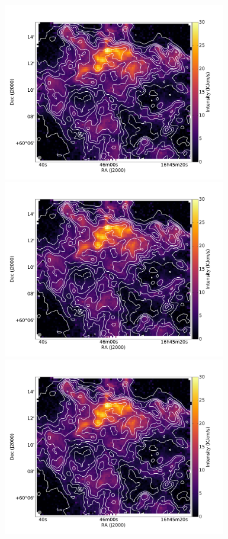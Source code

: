 \documentclass[traditabstract]{aa}
\begin{document}
\begin{figure}[h!]
  \centering
  \includegraphics[page=1,height=7.8cm,trim=25 30 90 75,clip=true]{Figures/CO10_intensity.pdf}
  \hspace{3mm}
  \includegraphics[page=4,height=7.8cm,trim=195 30 260 75,clip=true]{Figures/CO10_intensity.pdf} \\
  \includegraphics[page=2,height=7.8cm,trim=55 30 120 75,clip=true]{Figures/CO10_intensity.pdf}

\end{figure}
\end{document}
